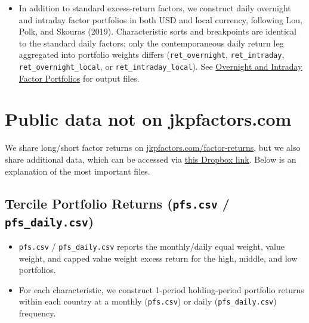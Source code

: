 \documentclass[12pt,title,fleqn]{article}
\begin{document}
\begin{itemize}
	\item In addition to standard excess-return factors, we construct daily overnight and intraday factor portfolios in both USD and local currency, following Lou, Polk, and Skouras (2019). Characteristic sorts and breakpoints are identical to the standard daily factors; only the contemporaneous daily return leg aggregated into portfolio weights differs (\texttt{ret\_overnight}, \texttt{ret\_intraday}, \texttt{ret\_overnight\_local}, or \texttt{ret\_intraday\_local}). See \hyperref[sec:oi-portfolios]{Overnight and Intraday Factor Portfolios} for output files.
\end{itemize}

\section{Public data not on jkpfactors.com}
We share long/short factor returns on \url{jkpfactors.com/factor-returns}, but we also share additional data, which can be accessed via \href{https://www.dropbox.com/scl/fo/zxha6i1zcjzx8a3mb2372/AN9kkos5H5UjjXUOqW3EuDs?rlkey=i3wkvrjbadft6hld863571dol&st=6sg3nmw0&dl=0}{this Dropbox link}. Below is an explanation of the most important files.

\subsection{Tercile Portfolio Returns (\texttt{pfs.csv} / \texttt{pfs\_daily.csv})}

\begin{itemize}
  \item \texttt{pfs.csv} / \texttt{pfs\_daily.csv} reports the monthly/daily equal weight, value weight, and capped value weight excess return for the high, middle, and low portfolios.
  \item For each characteristic, we construct 1-period holding-period portfolio returns within each country at a monthly (\texttt{pfs.csv}) or daily (\texttt{pfs\_daily.csv}) frequency.
\end{itemize}
\end{document}
